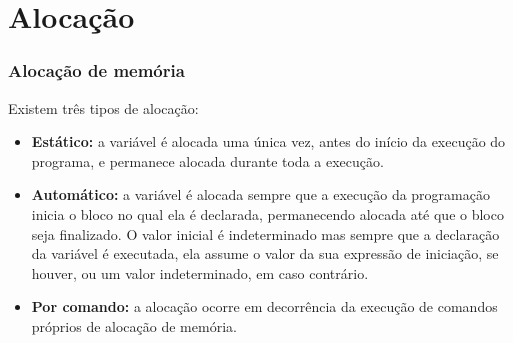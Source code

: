 \section{Alocação}

\begin{frame}
\frametitle{Alocação de memória}


Existem três tipos de alocação:

\begin{itemize}
\justifying
\item \textbf{Estático:} a variável é alocada uma única vez, antes do início da execução do programa, e permanece alocada durante toda a execução.
\item \textbf{Automático:} a variável é alocada sempre que a execução da programação inicia o bloco no qual ela é declarada, permanecendo alocada até que o bloco seja finalizado. O valor inicial é indeterminado mas sempre que a declaração da variável é executada, ela assume o valor da sua expressão de iniciação, se houver, ou um valor indeterminado, em caso contrário.
\item \textbf{Por comando:} a alocação ocorre em decorrência da execução de comandos próprios de alocação de memória.
\end{itemize}



\end{frame}





